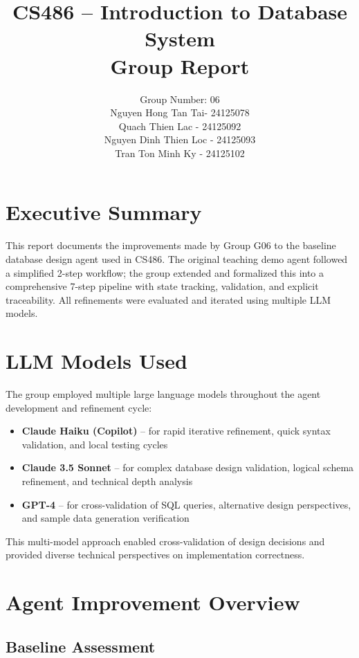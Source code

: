 \documentclass[12pt,a4paper]{article}
\title{\textbf{CS486 -- Introduction to Database System} \\ \vspace{0.5cm} \Large Group Report}
\author{Group Number: 06 \\Nguyen Hong Tan Tai- 24125078 \\Quach Thien Lac - 24125092 \\ Nguyen Dinh Thien Loc - 24125093 \\ Tran Ton Minh Ky - 24125102}
\begin{document}
\maketitle

\section*{Executive Summary}

This report documents the improvements made by Group G06 to the baseline database design agent used in CS486. The original teaching demo agent followed a simplified 2-step workflow; the group extended and formalized this into a comprehensive 7-step pipeline with state tracking, validation, and explicit traceability. All refinements were evaluated and iterated using multiple LLM models.

\newpage

\tableofcontents

\newpage

\section{LLM Models Used}

The group employed multiple large language models throughout the agent development and refinement cycle:

\begin{itemize}
    \item \textbf{Claude Haiku (Copilot)} -- for rapid iterative refinement, quick syntax validation, and local testing cycles
    \item \textbf{Claude 3.5 Sonnet} -- for complex database design validation, logical schema refinement, and technical depth analysis
    \item \textbf{GPT-4} -- for cross-validation of SQL queries, alternative design perspectives, and sample data generation verification
\end{itemize}

This multi-model approach enabled cross-validation of design decisions and provided diverse technical perspectives on implementation correctness.

\section{Agent Improvement Overview}

\subsection{Baseline Assessment}
\end{document}
